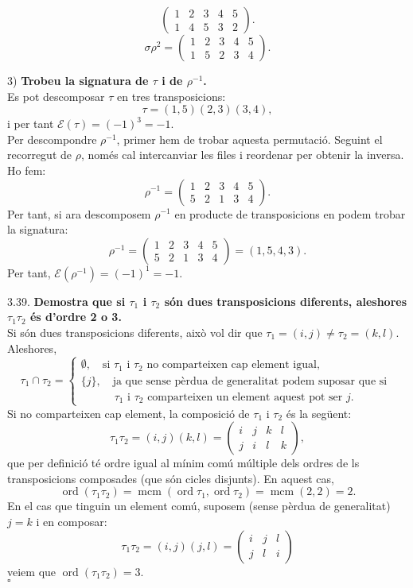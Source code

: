 \documentclass[11pt]{article}
\DeclareMathOperator{\ord}{ord}
\DeclareMathOperator{\mcm}{mcm}
\begin{document}
\begin{legal}
\begin{legal}
$$\begin{pmatrix}
		1 & 2 & 3 & 4 & 5\\
		1 & 4 & 5 & 3 & 2
		\end{pmatrix}.
		$$
		$$
		\sigma\rho^2=\begin{pmatrix}
		1 & 2 & 3 & 4 & 5\\
		1 & 5 & 2 & 3 & 4
		\end{pmatrix}.
		$$
		\item[3) ]\textbf{Trobeu la signatura de $\tau$ i de $\rho^{-1}$.}\\
		Es pot descomposar $\tau$ en tres transposicions:
		$$\tau=(1,5)(2,3)(3,4),$$
		i per tant $\mathcal{E}(\tau)=(-1)^3=-1.$\\
		Per descompondre $\rho^{-1}$, primer hem de trobar aquesta permutació. Seguint el recorregut de $\rho$, només cal intercanviar les files i reordenar per obtenir la inversa. Ho fem:
		$$\rho^{-1}=\begin{pmatrix}
		1 & 2 & 3 & 4 & 5\\
		5 & 2 & 1 & 3 & 4
		\end{pmatrix}.
		$$
		Per tant, si ara descomposem $\rho^{-1}$ en producte de transposicions en podem trobar la signatura:
		$$
		\rho^{-1}=\begin{pmatrix}
		1 & 2 & 3 & 4 & 5\\
		5 & 2 & 1 & 3 & 4
		\end{pmatrix}
		=(1,5,4,3).
		$$
		Per tant, $\mathcal{E}(\rho^{-1})=(-1)^1=-1$.
	\end{legal}\newpage
	\item[3.39.] \textbf{Demostra que si $\tau_1$ i $\tau_2$ són dues transposicions diferents, aleshores $\tau_1\tau_2$ és d'ordre 2 o 3.}\\
	Si són dues transposicions diferents, això vol dir que $\tau_1=(i,j)\neq\tau_2=(k,l)$. Aleshores,
	$$
	\tau_1\cap\tau_2=\begin{cases}
	\emptyset,\quad\textrm{si }\tau_1\textrm{ i }\tau_2\textrm{ no comparteixen cap element igual,}\\
	\{j\},\quad\textrm{ja que sense pèrdua de generalitat podem suposar que si }\\
	\qquad\quad\tau_1\textrm{ i }\tau_2\textrm{ comparteixen un element aquest pot ser }j.
	\end{cases}
	$$
	Si no comparteixen cap element, la composició de $\tau_1$ i $\tau_2$ és la següent:
	$$
	\tau_1\tau_2=(i,j)(k,l)=\begin{pmatrix}
	i & j & k & l\\
	j & i & l & k
	\end{pmatrix},
	$$
	que per definició té ordre igual al mínim comú múltiple dels ordres de ls transposicions composades (que són cicles disjunts). En aquest cas,
	$$
	\ord(\tau_1\tau_2)=\mcm(\ord{\tau_1},\ord{\tau_2})=\mcm(2,2)=2.
	$$
	En el cas que tinguin un element comú, suposem (sense pèrdua de generalitat) $j=k$ i en composar:
	$$
	\tau_1\tau_2=(i,j)(j,l)=\begin{pmatrix}
	i & j & l\\
	j & l & i
	\end{pmatrix}
	$$
	veiem que $\ord(\tau_1\tau_2)=3$.\\
	$\square$
\end{legal}
\end{document}
